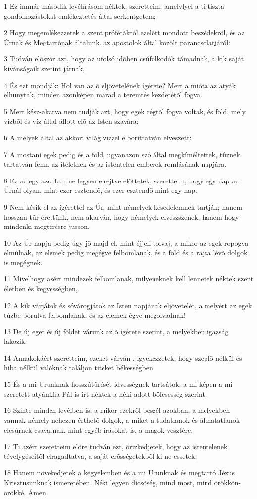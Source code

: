 \par 1 Ez immár második levélírásom néktek, szeretteim, amelylyel a ti tiszta gondolkozástokat emlékeztetés által serkentgetem;
\par 2 Hogy megemlékezzetek a szent prófétáktól ezelõtt mondott beszédekrõl, és az Úrnak és  Megtartónak általunk, az apostolok által közölt parancsolatjáról:
\par 3 Tudván elõször azt, hogy az utolsó idõben csúfolkodók támadnak, a kik saját kívánságaik szerint járnak,
\par 4 És ezt mondják: Hol van az õ eljövetelének ígérete? Mert a mióta az atyák elhunytak, minden azonképen marad a teremtés kezdetétõl fogva.
\par 5 Mert kész-akarva nem tudják azt, hogy egek régtõl fogva voltak, és föld, mely vízbõl és víz által állott elõ az Isten szavára;
\par 6 A melyek által az akkori világ vízzel elboríttatván elveszett:
\par 7 A mostani egek pedig és a föld, ugyanazon szó által megkíméltettek, tûznek tartatván fenn, az ítéletnek és az istentelen emberek romlásának  napjára.
\par 8 Ez az egy azonban ne legyen elrejtve elõttetek, szeretteim, hogy egy nap az Úrnál olyan, mint ezer esztendõ, és ezer esztendõ mint egy nap.
\par 9 Nem késik el az ígérettel az Úr, mint némelyek késedelemnek tartják; hanem hosszan tûr érettünk, nem akarván, hogy némelyek elveszszenek, hanem hogy mindenki  megtérésre jusson.
\par 10 Az Úr napja pedig úgy jõ majd el, mint éjjeli tolvaj, a mikor az egek ropogva elmúlnak, az elemek pedig megégve felbomlanak, és  a föld és a rajta lévõ dolgok is megégnek.
\par 11 Mivelhogy azért mindezek felbomlanak, milyeneknek kell lennetek néktek szent életben és kegyességben,
\par 12 A kik várjátok és sóvárogjátok az Isten napjának eljövetelét, a melyért az egek tûzbe borulva felbomlanak, és az elemek égve megolvadnak!
\par 13 De új eget és új földet várunk az õ ígérete szerint, a melyekben igazság lakozik.
\par 14 Annakokáért szeretteim, ezeket várván , igyekezzetek, hogy  szeplõ nélkül és hiba nélkül valóknak találjon titeket békességben.
\par 15 És a mi Urunknak hosszútûrését idvességnek tartsátok; a mi képen a mi szeretett atyánkfia Pál is írt néktek a néki adott bölcsesség szerint.
\par 16 Szinte minden levélben is, a mikor ezekrõl beszél azokban; a melyekben vannak némely nehezen érthetõ dolgok, a miket a tudatlanok és állhatatlanok elcsûrnek-csavarnak, mint egyéb írásokat is, a magok vesztére.
\par 17 Ti azért szeretteim elõre tudván ezt, õrizkedjetek, hogy az istentelenek tévelygéseitõl elragadtatva, a saját erõsségetekbõl  ki ne essetek;
\par 18 Hanem növekedjetek a kegyelemben és a mi Urunknak és megtartó Jézus Krisztusunknak ismeretében. Néki legyen dicsõség, mind most, mind örökkön-örökké. Ámen.


